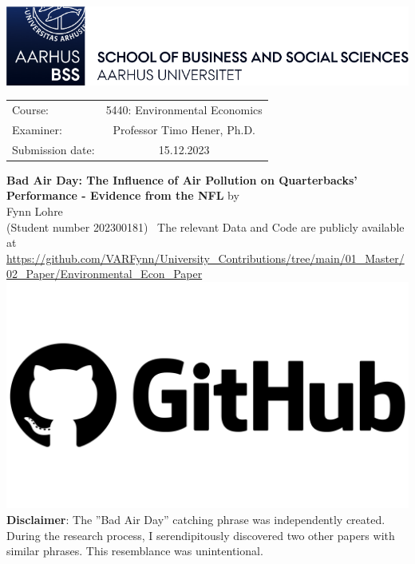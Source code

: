 \documentclass[12pt,a4paper]{article}
\author{\myname}
\title{\mytitle}
\newcommand{\myname}{Fynn Lohre}
\newcommand{\mytitle}{Bad Air Day: The Influence of Air Pollution on Quarterbacks' Performance - Evidence from the NFL}
\newcommand{\myexaminer}{Professor Timo Hener, Ph.D. }
\newcommand{\mycourse}{5440: Environmental Economics}
\newcommand{\mysubmission}{15.12.2023}
\newcommand{\mymatr}{202300181}
\begin{document}
\begin{titlepage}
\center
\vfill
\includegraphics[scale=0.90]{BSS.png}
\vfill
\begin{tabular}[t]{lc}
Course:  & \mycourse \\
Examiner: & \myexaminer \\
Submission date: & \mysubmission \\
\end{tabular}
\vfill
{\large \textbf{\mytitle}}
\vfill
by \\ \vspace{3mm}
{\Large \myname}\\
(Student number \mymatr)\
\vfill
The relevant Data and Code are publicly available at \url{https://github.com/VARFynn/University_Contributions/tree/main/01_Master/02_Paper/Environmental_Econ_Paper}\\ 
\href{https://github.com/VARFynn/University_Contributions/tree/main/01_Master/02_Paper/Environmental_Econ_Paper}{\includegraphics[scale=0.015]{GitHub.png}}
\vfill 
\scriptsize \textbf{Disclaimer}: The ''Bad Air Day'' catching phrase was independently created. During the research process, I serendipitously discovered two other papers with similar phrases. This resemblance was unintentional.
\vfill
\thispagestyle{empty}
\pagebreak
\end{titlepage}
\end{document}
